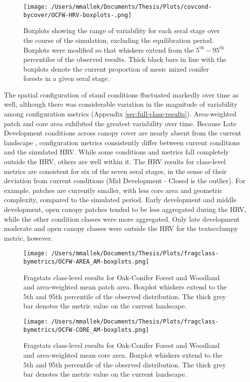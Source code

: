 \begin{figure}[!htbp]
  \centering
    \texttt{[image: /Users/mmallek/Documents/Thesis/Plots/covcond-bycover/OCFW-HRV-boxplots-.png]}
  \caption{Boxplots showing the range of variability for each seral stage over the course of the simulation, excluding the equilibration period. Boxplots were modified so that whiskers extend from the $5^{\text{th}} - 95^{\text{th}}$ percentiles of the observed results. Thick black bars in line with the boxplots denote the current proportion of mesic mixed conifer forests in a given seral stage.} 
  \label{fig:covcond_ocfw_boxplots}
\end{figure}

The spatial configuration of stand conditions fluctuated markedly over time as well, although there was considerable variation in the magnitude of variability among configuration metrics (Appendix \ref{sec:full-class-results}). Area-weighted patch and core area exhibited the greatest variability over time. Because Late Development conditions across canopy cover are nearly absent from the current landscape , configuration metrics consistently differ between current conditions and the simulated HRV. While some conditions and metrics fall completely outside the HRV, others are well within it. The HRV results for class-level metrics are consistent for six of the seven seral stages, in the sense of their deviation from current conditions (Mid Development - Closed is the outlier). For example, patches are currently smaller, with less core area and geometric complexity, compared to the simulated period. Early development and middle development, open canopy patches tended to be less aggregated during the HRV, while the other condition classes were more aggregated. Only late development moderate and open canopy classes were outside the HRV for the textsc{clumpy} metric, however.


\begin{figure}[!htbp]
\centering
    \texttt{[image: /Users/mmallek/Documents/Thesis/Plots/fragclass-bymetrics/OCFW-AREA\_AM-boxplots.png]}
  \caption{Fragstats class-level results for Oak-Conifer Forest and Woodland and area-weighted mean patch area. Boxplot whiskers extend to the 5th and 95th percentile of the observed distribution. The thick grey bar denotes the metric value on the current landscape.}
  \label{fig:ocfw_areaam}
\end{figure}


\begin{figure}[!htbp]
\centering
    \texttt{[image: /Users/mmallek/Documents/Thesis/Plots/fragclass-bymetrics/OCFW-CORE\_AM-boxplots.png]}
  \caption{Fragstats class-level results for Oak-Conifer Forest and Woodland and area-weighted mean core area. Boxplot whiskers extend to the 5th and 95th percentile of the observed distribution. The thick grey bar denotes the metric value on the current landscape.}
  \label{fig:ocfw_coream}
\end{figure}


